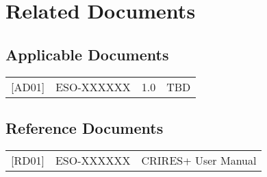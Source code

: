\section{Related Documents}
\label{sec:doc-related}

\subsection{Applicable Documents}
\label{sec:doc-applicable}

\begin{tabularx}{\linewidth}{lllX}
  {[}AD01{]} & ESO-XXXXXX & 1.0
             & TBD \\
\end{tabularx}

\subsection{Reference Documents}
\label{sec:doc-reference}

\begin{tabularx}{\linewidth}{llX}
  {[}RD01{]} & ESO-XXXXXX
             & CRIRES+ User Manual \\
\end{tabularx}


